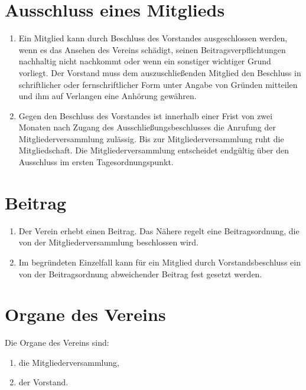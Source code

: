 \documentclass[a4paper]{article}
\begin{document}
\section{Ausschluss eines Mitglieds}
\begin{enumerate}
	\item Ein Mitglied kann durch Beschluss des Vorstandes ausgeschlossen werden, wenn es das Ansehen des Vereins schädigt, seinen Beitragsverpflichtungen nachhaltig nicht nachkommt oder wenn ein sonstiger wichtiger Grund vorliegt. Der Vorstand muss dem auszuschließenden Mitglied den Beschluss in schriftlicher oder fernschriftlicher Form unter Angabe von Gründen mitteilen und ihm auf Verlangen eine Anhörung gewähren.
	\item Gegen den Beschluss des Vorstandes ist innerhalb einer Frist von zwei Monaten nach Zugang des Ausschließungsbeschlusses die Anrufung der Mitgliederversammlung zulässig. Bis zur Mitgliederversammlung ruht die Mitgliedschaft. Die Mitgliederversammlung entscheidet endgültig über den Ausschluss im ersten Tagesordnungspunkt.
\end{enumerate}

\section{Beitrag}
\begin{enumerate}
	\item Der Verein erhebt einen Beitrag. Das Nähere regelt eine Beitragsordnung, die von der Mitgliederversammlung beschlossen wird.
	\item Im begründeten Einzelfall kann für ein Mitglied durch Vorstandsbeschluss ein von der Beitragsordnung abweichender Beitrag fest gesetzt werden.
\end{enumerate}

\section{Organe des Vereins}
Die Organe des Vereins sind:
\begin{enumerate}[1.]
	\item die Mitgliederversammlung,
	\item der Vorstand.
\end{enumerate}
\end{document}
